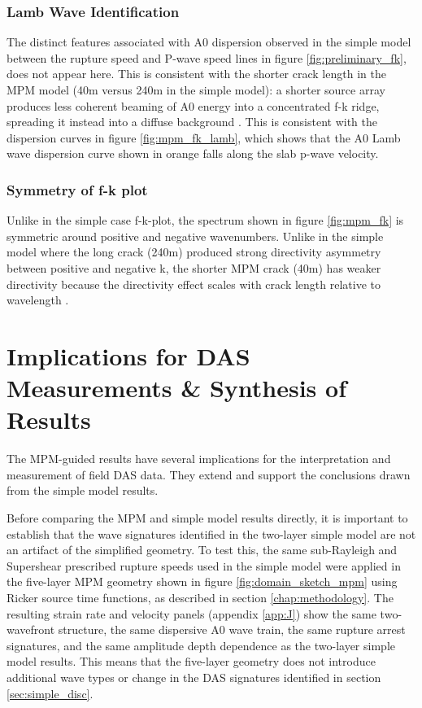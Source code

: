 \subsubsection{Lamb Wave Identification}

The distinct features associated with A0 dispersion observed in the simple model between the rupture speed and P-wave speed
lines in figure \ref{fig:preliminary_fk}, does not appear here. This is consistent with the shorter crack length in the MPM model (40m versus 240m in the simple model): a shorter source array produces less coherent beaming of A0 energy into a concentrated f-k ridge, spreading it instead into a diffuse background \parencite{roseWavesPlates2014}. This is consistent with the dispersion curves in figure \ref{fig:mpm_fk_lamb}, which shows that the A0 Lamb wave dispersion curve shown in orange falls along the slab p-wave velocity. \par

\subsubsection{Symmetry of f-k plot}

Unlike in the simple case f-k-plot, the spectrum shown in figure \ref{fig:mpm_fk} is symmetric around positive and negative wavenumbers. Unlike in the simple model where the long crack (240m)
produced strong directivity asymmetry between positive and negative k,
the shorter MPM crack (40m) has weaker directivity because the
directivity effect scales with crack length relative to wavelength \parencite{madariagaDynamicsExpandingCircular1976}. \par 

\section{Implications for DAS Measurements \& Synthesis of Results}

The MPM-guided results have several implications for the interpretation and measurement of field DAS data. They extend and support the conclusions drawn from the simple model results. \par


Before comparing the MPM and simple model results directly, it is
important to establish that the wave signatures identified in the
two-layer simple model are not an artifact of the simplified geometry.
To test this, the same sub-Rayleigh and Supershear prescribed rupture
speeds used in the simple model were applied in the five-layer MPM
geometry  shown in figure \ref{fig:domain_sketch_mpm} using Ricker source time functions, as described in section \ref{chap:methodology}. The resulting strain rate and velocity panels (appendix \ref{app:J}) show the same two-wavefront structure, the same dispersive A0 wave train, the same rupture arrest signatures, and the same amplitude depth dependence as the two-layer simple model results. This means that the five-layer geometry does not introduce additional wave types or change in the DAS signatures
identified in section \ref{sec:simple_disc}. \par

